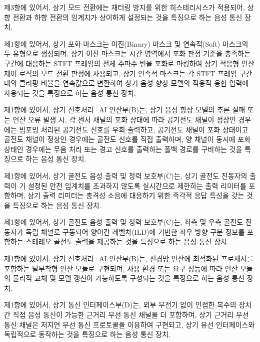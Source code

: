 \documentclass{article}
\begin{document}
\begin{enumerate}[label=\textbf{[\arabic*]}]
    \item 제3항에 있어서,
    상기 모드 전환에는 채터링 방지를 위한 히스테리시스가 적용되어, 상향 전환과 하향 전환의 임계치가 상이하게 설정되는 것을 특징으로 하는 음성 통신 장치.

    \item 제1항에 있어서,
    상기 포화 마스크는 이진(Binary) 마스크 및 연속적(Soft) 마스크의 두 유형으로 생성되며,
    상기 이진 마스크는 시간 영역에서 포화 판정 기준을 충족하는 구간에 대응하는 STFT 프레임의 전체 주파수 빈을 포화로 마킹하여 상기 적응형 연산 제어 로직의 모드 전환 판정에 사용되고,
    상기 연속적 마스크는 각 STFT 프레임 구간 내의 클리핑 비율을 연속값으로 변환하여 상기 음성 향상 모델의 적응적 융합 입력에 사용되는 것을 특징으로 하는 음성 통신 장치.

    \item 제1항에 있어서,
    상기 신호처리·AI 연산부(B)는, 상기 음성 향상 모델의 추론 실패 또는 연산 오류 발생 시, 각 센서 채널의 포화 상태에 따라
    공기전도 채널이 정상인 경우에는 빔포밍 처리된 공기전도 신호를 우회 출력하고,
    공기전도 채널이 포화 상태이고 골전도 채널이 정상인 경우에는 골전도 신호를 직접 출력하며,
    양 채널이 동시에 포화 상태인 경우에는 무음 처리 또는 경고 신호를 출력하는 폴백 경로를 구비하는 것을 특징으로 하는 음성 통신 장치.

    \item 제1항에 있어서,
    상기 골전도 음성 출력 및 청력 보호부(C)는, 상기 골전도 진동자의 출력이 기 설정된 안전 임계치를 초과하지 않도록 실시간으로 제한하는 출력 리미터를 포함하며,
    상기 출력 리미터는 충격성 소음에 대응하기 위한 즉각적 응답 특성을 갖는 것을 특징으로 하는 음성 통신 장치.

    \item 제1항에 있어서,
    상기 골전도 음성 출력 및 청력 보호부(C)는, 좌측 및 우측 골전도 진동자가 독립 채널로 구동되어 양이간 레벨차(ILD)에 기반한 좌우 방향 구분 정보를 포함하는 스테레오 골전도 출력을 제공하는 것을 특징으로 하는 음성 통신 장치.

    \item 제1항에 있어서,
    상기 신호처리·AI 연산부(B)는, 신경망 연산에 최적화된 프로세서를 포함하는 탈부착형 연산 모듈로 구현되며, 사용 환경 또는 요구 성능에 따라 연산 모듈의 물리적 교체 및 모델 갱신이 가능하도록 구성되는 것을 특징으로 하는 음성 통신 장치.

    \item 제1항에 있어서,
    상기 통신 인터페이스부(D)는, 외부 무전기 없이 인접한 복수의 장치 간 직접 음성 통신이 가능한 근거리 무선 통신 채널을 더 포함하며,
    상기 근거리 무선 통신 채널은 저지연 무선 통신 프로토콜을 이용하여 구현되고, 상기 유선 인터페이스와 독립적으로 동작하는 것을 특징으로 하는 음성 통신 장치.


\end{enumerate}
\end{document}
